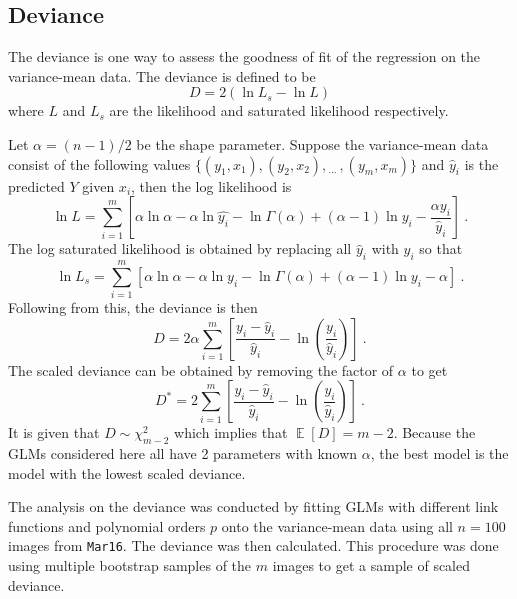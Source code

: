 \documentclass[12pt, a4paper]{memoir}
\DeclareMathOperator{\expectation}{\mathbb{E}}
\newcommand{\dotdotdot}{_{\phantom{.}\cdots}}
\begin{document}
\subsection{Deviance}
The deviance is one way to assess the goodness of fit of the regression on the variance-mean data. The deviance is defined to be
\begin{equation}
    D = 2\left(
        \ln L_s - \ln L    
    \right)
\end{equation}
where $L$ and $L_s$ are the likelihood and saturated likelihood respectively. 

Let $\alpha=(n-1)/2$ be the shape parameter. Suppose the variance-mean data consist of the following values $\{(y_1,x_1),(y_2,x_2),\dotdotdot,(y_m,x_m)\}$ and $\widehat{y}_i$ is the predicted $Y$ given $x_i$, then the log likelihood is
\begin{equation}
    \ln L = \sum_{i=1}^m \left[
        \alpha\ln\alpha
        -\alpha\ln \widehat{y_i}
        -\ln\Gamma(\alpha)
        +(\alpha-1)\ln y_i
        -\frac{\alpha y_i}{\widehat{y}_i}
    \right]
    \ .
\end{equation}
The log saturated likelihood is obtained by replacing all $\widehat{y}_i$ with $y_i$ so that
\begin{equation}
    \ln L_s = \sum_{i=1}^m \left[
        \alpha\ln\alpha
        -\alpha\ln{y_i}
        -\ln\Gamma(\alpha)
        +(\alpha-1)\ln y_i
        -\alpha
    \right]
    \ .
\end{equation}
Following from this, the deviance is then
\begin{equation}
    D = 2\alpha
    \sum_{i=1}^m\left[
        \dfrac{
            y_i-\widehat{y}_i
        }
        {
            \widehat{y}_i
        }
        - \ln\left(\dfrac{y_i}{\widehat{y}_i}\right)
    \right]
    \ .
\end{equation}
The scaled deviance can be obtained by removing the factor of $\alpha$ to get
\begin{equation}
    D^* = 2
    \sum_{i=1}^m\left[
        \dfrac{
            y_i-\widehat{y}_i
        }
        {
            \widehat{y}_i
        }
        - \ln\left(\dfrac{y_i}{\widehat{y}_i}\right)
    \right]
    \ .
\end{equation}
It is given that $D\sim\chi_{m-2}^2$ which implies that $\expectation\left[D\right]=m-2$. Because the GLMs considered here all have 2 parameters with known $\alpha$, the best model is the model with the lowest scaled deviance.

The analysis on the deviance was conducted by fitting GLMs with different link functions and polynomial orders $p$ onto the variance-mean data using all $n=100$ images from \texttt{Mar16}. The deviance was then calculated. This procedure was done using multiple bootstrap samples \citep{efron1992bootstrap} of the $m$ images to get a sample of scaled deviance.
\end{document}
